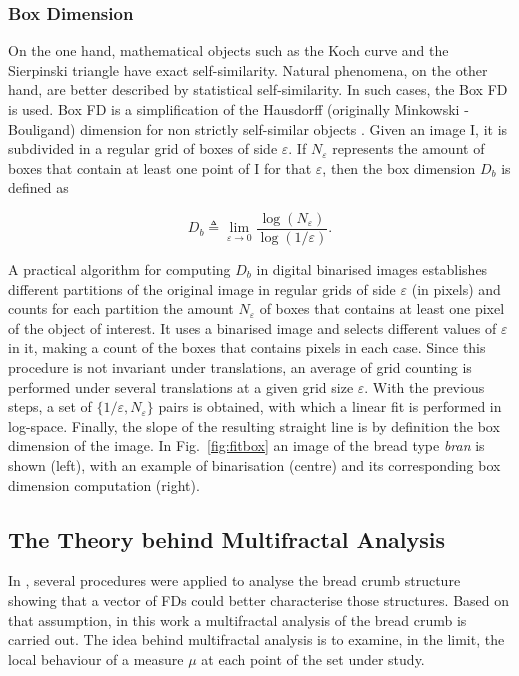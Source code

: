 \documentclass[twocolumn]{bmcart}%
\begin{document}
\subsubsection{Box Dimension}
\label{sec:3}
On the one hand, mathematical objects such as the Koch curve and the Sierpinski triangle have exact self-similarity. Natural phenomena, on the other hand, are better described by statistical self-similarity. In such cases, the Box FD is used. Box FD is a simplification of the Hausdorff (originally Minkowski - Bouligand) dimension for non strictly self-similar objects \cite{Peitgen2004}. Given an image I, it is subdivided in a regular grid of boxes of side $\varepsilon$. If $N_{\varepsilon}$ represents the amount of boxes that contain at least one point of I for that $\varepsilon$, then the box dimension  $D_{b}$ is defined as

\begin{equation}
D_{b} \triangleq \displaystyle\lim_{\varepsilon \to 0}{\frac{\log(N_{\varepsilon})}{\log (1/\varepsilon)}}.
\label{eqn:1}
\end{equation}

A practical algorithm for computing $D_{b}$ in digital binarised images establishes different partitions of the original image in regular grids of side $\varepsilon$ (in pixels) and counts for each partition the amount $N_{\varepsilon}$ of boxes that contains at least one pixel of the object of interest. It uses a binarised image and selects different values of $\varepsilon$ in it, making a count of the boxes that contains pixels in each case. Since this procedure is not invariant under translations, an average of grid counting is performed under several translations at a given grid size $\varepsilon$. With the previous steps, a set of $\{1/\varepsilon, N_\varepsilon\}$ pairs is obtained, with which a linear fit is performed in log-space. Finally, the slope of the resulting straight line is by definition the box dimension of the image. In Fig.~\ref{fig:fitbox} an image of the bread type {\em bran} is shown (left), with an example of binarisation (centre) and its corresponding box dimension computation (right).


\subsection{The Theory behind Multifractal Analysis}
\label{sec:4}

In \cite{Gonzales2008}, several procedures were applied to analyse the bread crumb structure showing that a vector of FDs could better characterise those structures. Based on that assumption, in this work a multifractal analysis of the bread crumb is carried out. The idea behind multifractal analysis is to examine, in the limit, the local behaviour of a measure $\mu$ at each point of the set under study. 
\end{document}
